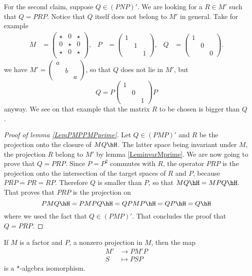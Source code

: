 For the second claim, suppose $Q\in(PNP)'$. We are looking for a $R\in M'$ such that $Q=PRP$. Notice that $Q$ itself does not belong to $M'$ in general. Take for example
\begin{align*}
M&=\begin{pmatrix}
\star&0&\star\\
0&\star&0\\
\star&0&\star\\
\end{pmatrix},		
&
P&=\begin{pmatrix}
1\\
&1\\
&&1
\end{pmatrix},
&
Q&=\begin{pmatrix}
1\\
&0\\
&&0
\end{pmatrix}.
\end{align*}
we have $M'=\begin{pmatrix}
a\\
&b\\
&&a
\end{pmatrix}$, so that $Q$ does not lie in $M'$, but
\[ 
  Q=P\begin{pmatrix}
1\\
&0\\
&&1
\end{pmatrix}P
\]
anyway. We see on that example that the matrix $R$ to be chosen is bigger than $Q$.
	
\begin{proof}[Proof of lemma \ref{LemPMPPMPprime}]
Let $Q\in (PMP)'$ and $R$ be the projection onto the closure of $MQ\hH$. The latter space being invariant under $M$, the projection $R$ belong to $M'$ by lemma \ref{LeminvarMprime}. We are now going to prove that $Q=PRP$. Since $P=P^2$ commutes with $R$, the operator $PRP$ is the projection onto the intersection of the target spaces of $R$ and $P$, because $PRP=PR=RP$. Therefore $Q$ is smaller than $P$, so that $MQ\hH=MPQ\hH$. That proves that $PRP$ is the projection on
\[ 
  PMQ\hH=PMPQ\hH=QPMP\hH=QP\hH=Q\hH
\]
where we used the fact that $Q\in(PMP)'$. That concludes the proof that $Q=PRP$.
\end{proof}

\begin{lemma}		\label{LemMapipsomPMmP}
If $M$ is a factor and $P$, a nonzero projection in $M$, then the map
\begin{equation}
\begin{aligned}
 M'&\to PM'P \\ 
   S&\mapsto PSP 
\end{aligned}
\end{equation}
is a $*$-algebra isomorphism.
\end{lemma}
 
